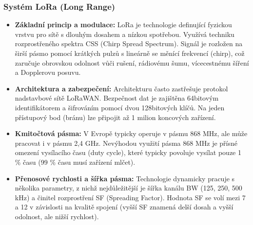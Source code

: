 		\subsubsection{Systém LoRa (Long Range)}
			\begin{itemize}
				\item \textbf{Základní princip a modulace:} LoRa je technologie definující fyzickou vrstvu pro sítě s dlouhým dosahem a nízkou spotřebou. Využívá techniku rozprostřeného spektra CSS (Chirp Spread Spectrum). Signál je rozložen na širší pásmo pomocí krátkých pulzů s lineárně se měnící frekvencí (chirp), což zaručuje obrovskou odolnost vůči rušení, rádiovému šumu, vícecestnému šíření a Dopplerovu posuvu.
				\item \textbf{Architektura a zabezpečení:} Architekturu často zastřešuje protokol nadstavbové sítě LoRaWAN. Bezpečnost dat je zajištěna 64bitovým identifikátorem a šifrováním pomocí dvou 128bitových klíčů. Na jeden přístupový bod (bránu) lze připojit až 1 milion koncových zařízení.
				\item \textbf{Kmitočtová pásma:} V Evropě typicky operuje v pásmu 868 MHz, ale může pracovat i v pásmu 2,4 GHz. Nevýhodou využití pásma 868 MHz je přísné omezení vysílacího času (duty cycle), které typicky povoluje vysílat pouze 1 \% času (99 \% času musí zařízení mlčet).
				\item \textbf{Přenosové rychlosti a šířka pásma:} Technologie dynamicky pracuje s několika parametry, z nichž nejdůležitější je šířka kanálu BW (125, 250, 500 kHz) a činitel rozprostření SF (Spreading Factor). Hodnota SF se volí mezi 7 a 12 v závislosti na kvalitě spojení (vyšší SF znamená delší dosah a vyšší odolnost, ale nižší rychlost).
			\end{itemize}